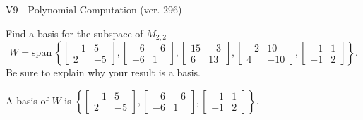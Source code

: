 \begin{exercise}
  \begin{exerciseTitle}V9 - Polynomial Computation (ver. 296)\end{exerciseTitle}
  \begin{exerciseStatement}
    Find a basis for the subspace of \(M_{2,2}\) 
\[W=\mathrm{span}\ \left\{\left[\begin{array}{cc}
-1 & 5 \\
2 & -5
\end{array}\right] , \left[\begin{array}{cc}
-6 & -6 \\
-6 & 1
\end{array}\right] , \left[\begin{array}{cc}
15 & -3 \\
6 & 13
\end{array}\right] , \left[\begin{array}{cc}
-2 & 10 \\
4 & -10
\end{array}\right] , \left[\begin{array}{cc}
-1 & 1 \\
-1 & 2
\end{array}\right]\right\}.\]
 Be sure to explain why your result is a basis.


  \end{exerciseStatement}
  \begin{exerciseAnswer}
   A basis of \(W\) is  \(\left\{\left[\begin{array}{cc}
-1 & 5 \\
2 & -5
\end{array}\right] , \left[\begin{array}{cc}
-6 & -6 \\
-6 & 1
\end{array}\right] , \left[\begin{array}{cc}
-1 & 1 \\
-1 & 2
\end{array}\right]\right\}\).
  


  \end{exerciseAnswer}
\end{exercise}